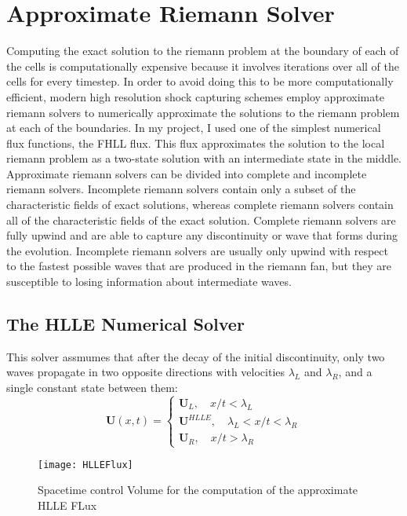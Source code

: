 \section{Approximate Riemann Solver}
Computing the exact solution to the riemann problem at the boundary of each of the cells is computationally expensive because it involves iterations over all of the cells for every timestep. In order to avoid doing this to be more computationally efficient, modern high resolution shock capturing schemes employ approximate riemann solvers to numerically approximate the solutions to the riemann problem at each of the boundaries. In my project, I used one of the simplest numerical flux functions, the FHLL flux. This flux approximates the solution to the local riemann problem as a two-state solution with an intermediate state in the middle. 
Approximate riemann solvers can be divided into complete and incomplete riemann solvers. Incomplete riemann solvers contain only a subset of the characteristic fields of exact solutions, whereas complete riemann solvers contain all of the characteristic fields of the exact solution. Complete riemann solvers are fully upwind and are able to capture any discontinuity or wave that forms during the evolution. Incomplete riemann solvers are usually only upwind with respect to the fastest possible waves that are produced in the riemann fan, but they are susceptible to losing information about intermediate waves. 
\subsection{The HLLE Numerical Solver}
This solver assmumes that after the decay of the initial discontinuity, only two waves propagate in two opposite directions with velocities $\lambda_L$ and $\lambda_R$, and a single constant state between them:
$$\bm{U}(x,t)=\begin{cases}
		\bm{U}_L , \quad x/t < \lambda_L \\
		\bm{U}^{HLLE} , \quad \lambda_L < x/t < \lambda_R \\
		\bm{U}_R , \quad x/t > \lambda_R
\end{cases}$$

\begin{figure}[h]
		\centering
		\texttt{[image: HLLEFlux]}
		\caption{Spacetime control Volume for the computation of the approximate HLLE FLux}
\end{figure}

